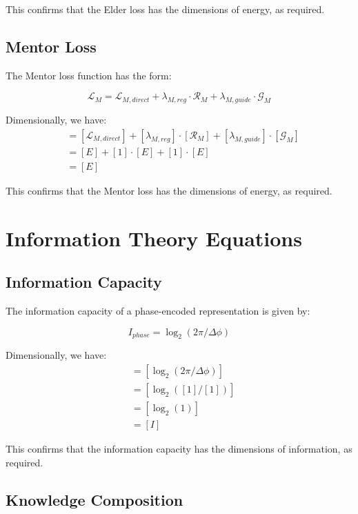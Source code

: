 This confirms that the Elder loss has the dimensions of energy, as required.

\subsection{Mentor Loss}

The Mentor loss function has the form:

\begin{equation}
\mathcal{L}_{M} = \mathcal{L}_{M,direct} + \lambda_{M,reg} \cdot \mathcal{R}_{M} + \lambda_{M,guide} \cdot \mathcal{G}_{M}
\end{equation}

Dimensionally, we have:
\begin{align}
[\mathcal{L}_{M}] &= [\mathcal{L}_{M,direct}] + [\lambda_{M,reg}] \cdot [\mathcal{R}_{M}] + [\lambda_{M,guide}] \cdot [\mathcal{G}_{M}] \\
&= [E] + [1] \cdot [E] + [1] \cdot [E] \\
&= [E]
\end{align}

This confirms that the Mentor loss has the dimensions of energy, as required.

\section{Information Theory Equations}

\subsection{Information Capacity}

The information capacity of a phase-encoded representation is given by:

\begin{equation}
I_{phase} = \log_2(2\pi / \Delta \phi)
\end{equation}

Dimensionally, we have:
\begin{align}
[I_{phase}] &= [\log_2(2\pi / \Delta \phi)] \\
&= [\log_2([1] / [1])] \\
&= [\log_2(1)] \\
&= [I]
\end{align}

This confirms that the information capacity has the dimensions of information, as required.

\subsection{Knowledge Composition}

